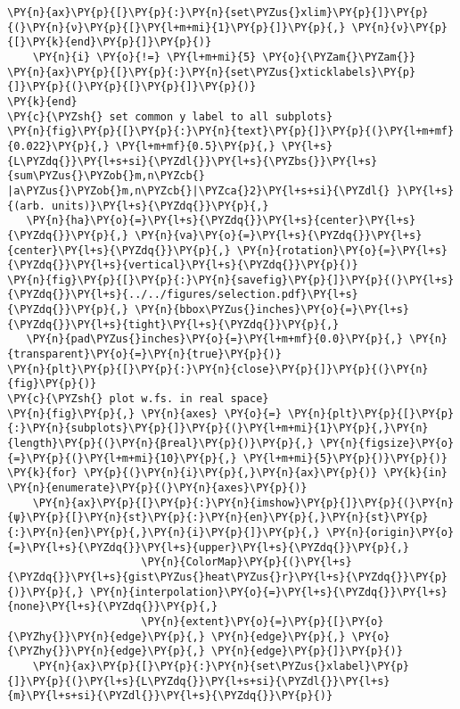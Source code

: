 \begin{Verbatim}[commandchars=\\\{\}]
    \PY{n}{ax}\PY{p}{[}\PY{p}{:}\PY{n}{set\PYZus{}xlim}\PY{p}{]}\PY{p}{(}\PY{n}{ν}\PY{p}{[}\PY{l+m+mi}{1}\PY{p}{]}\PY{p}{,} \PY{n}{ν}\PY{p}{[}\PY{k}{end}\PY{p}{]}\PY{p}{)}
    \PY{n}{i} \PY{o}{!=} \PY{l+m+mi}{5} \PY{o}{\PYZam{}\PYZam{}} \PY{n}{ax}\PY{p}{[}\PY{p}{:}\PY{n}{set\PYZus{}xticklabels}\PY{p}{]}\PY{p}{(}\PY{p}{[}\PY{p}{]}\PY{p}{)}
\PY{k}{end}
\PY{c}{\PYZsh{} set common y label to all subplots}
\PY{n}{fig}\PY{p}{[}\PY{p}{:}\PY{n}{text}\PY{p}{]}\PY{p}{(}\PY{l+m+mf}{0.022}\PY{p}{,} \PY{l+m+mf}{0.5}\PY{p}{,} \PY{l+s}{L\PYZdq{}}\PY{l+s+si}{\PYZdl{}}\PY{l+s}{\PYZbs{}}\PY{l+s}{sum\PYZus{}\PYZob{}m,n\PYZcb{} |a\PYZus{}\PYZob{}m,n\PYZcb{}|\PYZca{}2}\PY{l+s+si}{\PYZdl{} }\PY{l+s}{(arb. units)}\PY{l+s}{\PYZdq{}}\PY{p}{,}
   \PY{n}{ha}\PY{o}{=}\PY{l+s}{\PYZdq{}}\PY{l+s}{center}\PY{l+s}{\PYZdq{}}\PY{p}{,} \PY{n}{va}\PY{o}{=}\PY{l+s}{\PYZdq{}}\PY{l+s}{center}\PY{l+s}{\PYZdq{}}\PY{p}{,} \PY{n}{rotation}\PY{o}{=}\PY{l+s}{\PYZdq{}}\PY{l+s}{vertical}\PY{l+s}{\PYZdq{}}\PY{p}{)}
\PY{n}{fig}\PY{p}{[}\PY{p}{:}\PY{n}{savefig}\PY{p}{]}\PY{p}{(}\PY{l+s}{\PYZdq{}}\PY{l+s}{../../figures/selection.pdf}\PY{l+s}{\PYZdq{}}\PY{p}{,} \PY{n}{bbox\PYZus{}inches}\PY{o}{=}\PY{l+s}{\PYZdq{}}\PY{l+s}{tight}\PY{l+s}{\PYZdq{}}\PY{p}{,}
   \PY{n}{pad\PYZus{}inches}\PY{o}{=}\PY{l+m+mf}{0.0}\PY{p}{,} \PY{n}{transparent}\PY{o}{=}\PY{n}{true}\PY{p}{)}
\PY{n}{plt}\PY{p}{[}\PY{p}{:}\PY{n}{close}\PY{p}{]}\PY{p}{(}\PY{n}{fig}\PY{p}{)}
\PY{c}{\PYZsh{} plot w.fs. in real space}
\PY{n}{fig}\PY{p}{,} \PY{n}{axes} \PY{o}{=} \PY{n}{plt}\PY{p}{[}\PY{p}{:}\PY{n}{subplots}\PY{p}{]}\PY{p}{(}\PY{l+m+mi}{1}\PY{p}{,}\PY{n}{length}\PY{p}{(}\PY{n}{βreal}\PY{p}{)}\PY{p}{,} \PY{n}{figsize}\PY{o}{=}\PY{p}{(}\PY{l+m+mi}{10}\PY{p}{,} \PY{l+m+mi}{5}\PY{p}{)}\PY{p}{)}
\PY{k}{for} \PY{p}{(}\PY{n}{i}\PY{p}{,}\PY{n}{ax}\PY{p}{)} \PY{k}{in} \PY{n}{enumerate}\PY{p}{(}\PY{n}{axes}\PY{p}{)}
    \PY{n}{ax}\PY{p}{[}\PY{p}{:}\PY{n}{imshow}\PY{p}{]}\PY{p}{(}\PY{n}{ψ}\PY{p}{[}\PY{n}{st}\PY{p}{:}\PY{n}{en}\PY{p}{,}\PY{n}{st}\PY{p}{:}\PY{n}{en}\PY{p}{,}\PY{n}{i}\PY{p}{]}\PY{p}{,} \PY{n}{origin}\PY{o}{=}\PY{l+s}{\PYZdq{}}\PY{l+s}{upper}\PY{l+s}{\PYZdq{}}\PY{p}{,}
                     \PY{n}{ColorMap}\PY{p}{(}\PY{l+s}{\PYZdq{}}\PY{l+s}{gist\PYZus{}heat\PYZus{}r}\PY{l+s}{\PYZdq{}}\PY{p}{)}\PY{p}{,} \PY{n}{interpolation}\PY{o}{=}\PY{l+s}{\PYZdq{}}\PY{l+s}{none}\PY{l+s}{\PYZdq{}}\PY{p}{,}
                     \PY{n}{extent}\PY{o}{=}\PY{p}{[}\PY{o}{\PYZhy{}}\PY{n}{edge}\PY{p}{,} \PY{n}{edge}\PY{p}{,} \PY{o}{\PYZhy{}}\PY{n}{edge}\PY{p}{,} \PY{n}{edge}\PY{p}{]}\PY{p}{)}
    \PY{n}{ax}\PY{p}{[}\PY{p}{:}\PY{n}{set\PYZus{}xlabel}\PY{p}{]}\PY{p}{(}\PY{l+s}{L\PYZdq{}}\PY{l+s+si}{\PYZdl{}}\PY{l+s}{m}\PY{l+s+si}{\PYZdl{}}\PY{l+s}{\PYZdq{}}\PY{p}{)}

\end{Verbatim}

